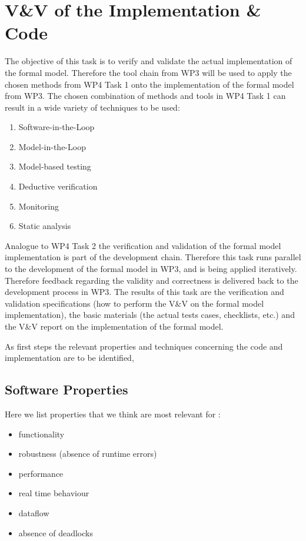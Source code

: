 \section{V\&V of the Implementation \& Code}

The objective of this task is to verify and validate the actual implementation of the formal model. Therefore the tool chain from WP3 will be used to apply the chosen methods from WP4 Task 1 onto the implementation of the formal model from WP3. The chosen combination of methods and tools in WP4 Task 1 can result in a wide variety of techniques to be used:
\begin{enumerate}
\item Software-in-the-Loop
\item  Model-in-the-Loop
\item  Model-based testing
\item  Deductive verification
\item  Monitoring
\item  Static analysis
\end{enumerate}
Analogue to WP4 Task 2 the verification and validation of the formal model implementation is part of the development chain. Therefore this task runs parallel to the development of the formal model in WP3, and is being applied iteratively. Therefore feedback regarding the validity and correctness is delivered back to the development process in WP3.
The results of this task are the verification and validation specifications (how to perform the V\&V on the formal model implementation), the basic materials (the actual tests cases, checklists, etc.) and the V\&V report on the implementation of the formal model.

As first steps the relevant properties and techniques concerning the code and implementation are to be identified, 

\subsection{Software Properties}
Here we list properties that we think are most relevant for \vv:

\begin{itemize}
\item functionality
\item robustness (absence of runtime errors)
\item performance
\item real time behaviour
\item dataflow
\item absence of deadlocks
\end{itemize}


